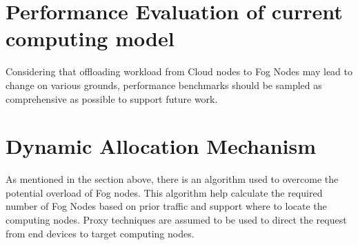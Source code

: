 \section{Performance Evaluation of current computing model}
Considering that offloading workload from Cloud nodes to Fog Nodes may lead to change on various grounds, performance benchmarks should be sampled as comprehensive as possible to support future work.

\section{Dynamic Allocation Mechanism}
As mentioned in the section above, there is an algorithm used to overcome the potential overload of Fog nodes. This algorithm help calculate the required number of Fog Nodes based on prior traffic and support where to locate the computing nodes. Proxy techniques are assumed to be used to direct the request from end devices to target computing nodes.